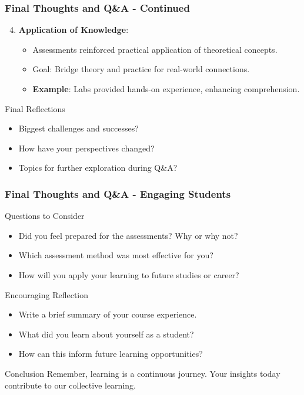 \documentclass{beamer}
\begin{document}
\begin{frame}[fragile]
    \frametitle{Final Thoughts and Q\&A - Continued}
    \begin{enumerate}
        \setcounter{enumi}{3} %
        \item \textbf{Application of Knowledge}:
            \begin{itemize}
                \item Assessments reinforced practical application of theoretical concepts.
                \item Goal: Bridge theory and practice for real-world connections.
                \item \textbf{Example}: Labs provided hands-on experience, enhancing comprehension.
            \end{itemize}
    \end{enumerate}
    
    \begin{block}{Final Reflections}
        \begin{itemize}
            \item Biggest challenges and successes?
            \item How have your perspectives changed?
            \item Topics for further exploration during Q\&A?
        \end{itemize}
    \end{block}
\end{frame}

\begin{frame}[fragile]
    \frametitle{Final Thoughts and Q\&A - Engaging Students}
    \begin{block}{Questions to Consider}
        \begin{itemize}
            \item Did you feel prepared for the assessments? Why or why not?
            \item Which assessment method was most effective for you?
            \item How will you apply your learning to future studies or career?
        \end{itemize}
    \end{block}
    
    \begin{block}{Encouraging Reflection}
        \begin{itemize}
            \item Write a brief summary of your course experience.
            \item What did you learn about yourself as a student?
            \item How can this inform future learning opportunities?
        \end{itemize}
    \end{block}

    \begin{block}{Conclusion}
        Remember, learning is a continuous journey. Your insights today contribute to our collective learning.
    \end{block}
\end{frame}
\end{document}
